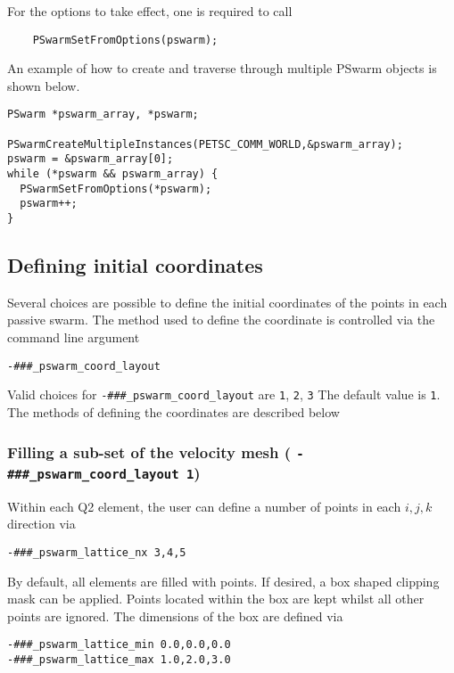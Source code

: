 \documentclass[paper=a4, fontsize=10pt,twoside]{scrartcl}
\begin{document}
{{For the options to take effect, one is required to call
\begin{lstlisting}
    PSwarmSetFromOptions(pswarm);
\end{lstlisting}
An example of how to create and traverse through multiple PSwarm objects is shown below.
\begin{lstlisting}
PSwarm *pswarm_array, *pswarm;

PSwarmCreateMultipleInstances(PETSC_COMM_WORLD,&pswarm_array);
pswarm = &pswarm_array[0];
while (*pswarm && pswarm_array) {
  PSwarmSetFromOptions(*pswarm);
  pswarm++;
}
\end{lstlisting}



\subsection{Defining initial coordinates}

Several choices are possible to define the initial coordinates of the points in each passive swarm.
The method used to define the coordinate is controlled via the command line argument
\begin{lstlisting}
-###_pswarm_coord_layout
\end{lstlisting}

Valid choices for \texttt{-\#\#\#\_pswarm\_coord\_layout} are \texttt{1}, \texttt{2}, \texttt{3}
The default value is \texttt{1}.
The methods of defining the coordinates are described below


\subsubsection{Filling a sub-set of the velocity mesh ( \texttt{-\#\#\#\_pswarm\_coord\_layout 1})}

Within each Q2 element, the user can define a number of points in each $i,j,k$ direction via
\begin{lstlisting}
-###_pswarm_lattice_nx 3,4,5
\end{lstlisting}

By default, all elements are filled with points.
If desired, a box shaped clipping mask can be applied. Points located within the box are kept
whilst all other points are ignored. The dimensions of the box are defined via
\begin{lstlisting}
-###_pswarm_lattice_min 0.0,0.0,0.0
-###_pswarm_lattice_max 1.0,2.0,3.0
\end{lstlisting}

}}
\end{document}
